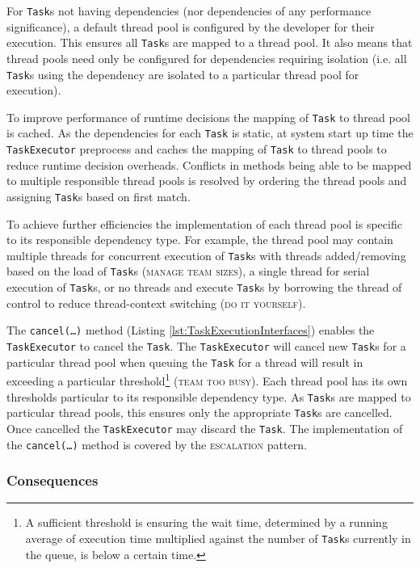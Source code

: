 \documentclass[prodmode]{style/acmlarge}
\begin{document}
For \texttt{Task}s not having dependencies (nor dependencies of any performance
significance), a default thread pool is configured by the developer for their
execution.  This ensures all \texttt{Task}s are mapped to a thread pool.  It
also means that thread pools need only be configured for dependencies requiring
isolation (i.e. all \texttt{Task}s using the dependency are isolated to a
particular thread pool for execution).

To improve performance of runtime decisions the mapping of \texttt{Task} to
thread pool is cached.  As the dependencies for each \texttt{Task} is static, at
system start up time the \texttt{TaskExecutor} preprocess and caches the mapping
of \texttt{Task} to thread pools to reduce runtime decision overheads. 
Conflicts in methods being able to be mapped to multiple responsible thread
pools is resolved by ordering the thread pools and assigning \texttt{Task}s
based on first match.

To achieve further efficiencies the implementation of each thread pool is
specific to its responsible dependency type.  For example, the thread pool may
contain multiple threads for concurrent execution of \texttt{Task}s with threads
added/removing based on the load of \texttt{Task}s (\textsc{manage team sizes}),
a single thread for serial execution of \texttt{Task}s, or no threads and
execute \texttt{Task}s by borrowing the thread of control to reduce
thread-context switching (\textsc{do it yourself}).

The \texttt{cancel(\ldots)} method (Listing \ref{lst:TaskExecutionInterfaces})
enables the \texttt{TaskExecutor} to cancel the \texttt{Task}. The
\texttt{Task\-Executor} will cancel new \texttt{Task}s for a particular thread
pool when queuing the \texttt{Task} for a thread will result in exceeding a
particular threshold\footnote{A sufficient threshold is ensuring the wait
time, determined by a running average of execution time multiplied against the
number of \texttt{Task}s currently in the queue, is below a certain time.}
(\textsc{team too busy}).  Each thread pool has its own thresholds particular to
its responsible dependency type.  As \texttt{Task}s are mapped to particular
thread pools, this ensures only the appropriate \texttt{Task}s are cancelled.
Once cancelled the \texttt{TaskExecutor} may discard the \texttt{Task}.  The
implementation of the \texttt{can\-cel(\ldots)} method is covered by the
\textsc{escalation} pattern.


\subsubsection*{Consequences}
\end{document}
